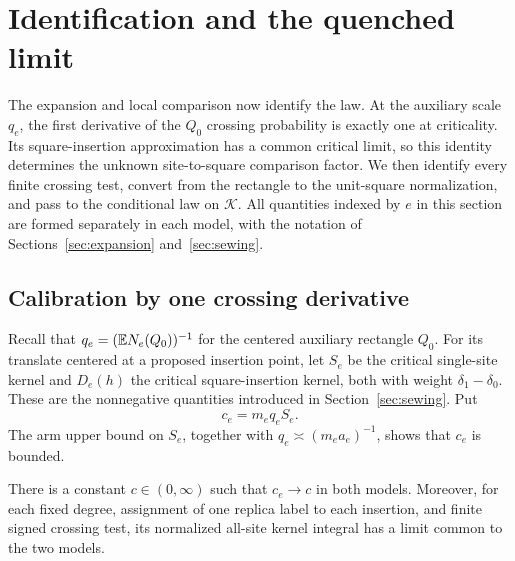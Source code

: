 \section{Identification and the quenched limit}
\label{sec:identification}

The expansion and local comparison now identify the law.  At the
auxiliary scale $q_e$, the first derivative of the $Q_0$ crossing
probability is exactly one at criticality.  Its square-insertion
approximation has a common critical limit, so this identity determines the unknown
site-to-square comparison factor.  We then identify every finite
crossing test, convert from the rectangle to the unit-square
normalization, and pass to the conditional law on $\mathcal K$.
All quantities indexed by $e$ in this section are formed separately
in each model, with the notation of
Sections~\ref{sec:expansion} and~\ref{sec:sewing}.

\subsection{Calibration by one crossing derivative}

Recall that $q_e=(\mathbb E N_e(Q_0))^{-1}$ for the centered auxiliary
rectangle $Q_0$. For its translate centered at a proposed insertion
point, let $S_e$ be the critical single-site kernel and $D_e(h)$ the
critical square-insertion kernel, both with weight
$\delta_1-\delta_0$. These are the nonnegative quantities introduced
in Section~\ref{sec:sewing}. Put
\begin{equation}
 c_e=m_e q_e S_e.
 \label{eq:amplitude-ratio}
\end{equation}
The arm upper bound on $S_e$, together with
$q_e\asymp(m_e a_e)^{-1}$, shows that $c_e$ is bounded.

\begin{lemma}
\label{lem:common-calibration}
There is a constant $c\in(0,\infty)$ such that $c_e\to c$ in both
models. Moreover, for each fixed degree, assignment of one replica
label to each insertion, and finite signed crossing test, its normalized
all-site kernel integral has a limit common to the two models.
\end{lemma}

